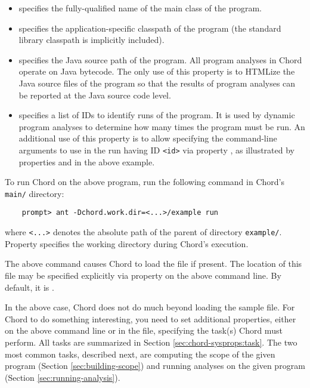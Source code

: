 \begin{itemize}
\item
{} specifies the fully-qualified name of the main
class of the program.
\item
{} specifies the application-specific classpath
of the program (the standard library classpath is implicitly
included).
\item
{} specifies the Java source path of the program.
All program analyses in Chord operate on Java bytecode.  The only use
of this property is to HTMLize the Java source files of the program so
that the results of program analyses can be reported at the Java
source code level.
\item
{} specifies a list of IDs to identify runs of the
program.  It is used by dynamic program analyses to determine how many
times the program must be run.  An additional use of this property is
to allow specifying the command-line arguments to use in the run
having ID {\tt <id>} via property , as
illustrated by properties  and 
in the above example.
\end{itemize}

To run Chord on the above program, run the following command in
Chord's {\tt main/} directory:

\begin{verbatim}
    prompt> ant -Dchord.work.dir=<...>/example run
\end{verbatim}

\noindent where {\tt <...>} denotes the absolute path of the parent of
directory {\tt example/}.  Property  specifies
the working directory during Chord's execution.

The above command causes Chord to load the 
file if present.  The location of this file may be specified
explicitly via property  on the above command
line.  By default, it is .

In the above case, Chord does not do much beyond loading the sample
 file.  For Chord to do something interesting,
you need to set additional properties, either on the above command
line or in the  file, specifying the task(s)
Chord must perform.  All tasks are summarized in Section
\ref{sec:chord-sysprops:task}.  The two most common tasks, described
next, are computing the scope of the given program (Section
\ref{sec:building-scope}) and running analyses on the given program
(Section \ref{sec:running-analysis}).

